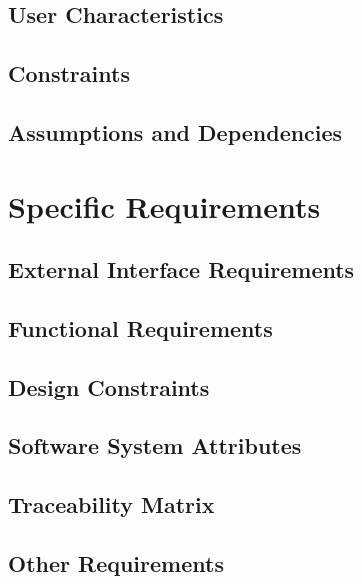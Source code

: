 \documentclass{article}
\begin{document}
	\subsection{User Characteristics}
	
	
	\subsection{Constraints}
	
	
	\subsection{Assumptions and Dependencies}
	
	
\clearpage
\section{Specific Requirements}
	\subsection{External Interface Requirements}
	
	
	\clearpage
	\subsection{Functional Requirements}
	
		
	\subsection{Design Constraints}
	
	
	\subsection{Software System Attributes}
	

	\subsection{Traceability Matrix}
		
	
	\subsection{Other Requirements}
	
\end{document}

